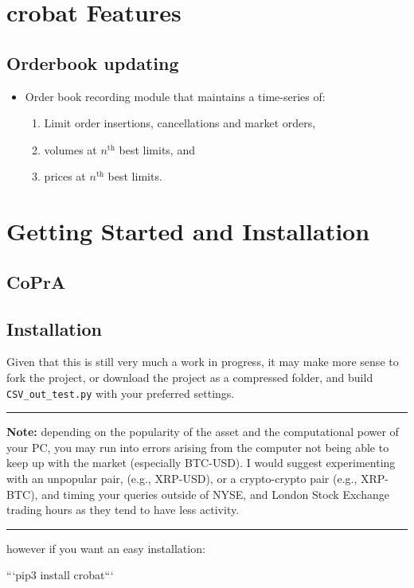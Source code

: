 \newpage
\section{crobat Features} 

\subsection{Orderbook updating}
\begin{itemize}
	\item Order book recording module that maintains a time-series of:
	\begin{enumerate}
		\item Limit order insertions, cancellations and market orders,
		\item volumes at $n^{\textrm{th}}$ best limits, and
		\item prices at  $n^{\textrm{th}}$ best limits.
	\end{enumerate}
\end{itemize}

\newpage

\section{Getting Started and Installation}

\subsection{CoPrA}

\subsection{Installation}

Given that this is still very much a work in progress, it may make more sense to fork the project, or download the project as a compressed folder, and build \texttt{CSV\_out\_test.py} with your preferred settings.
\medskip
\hrule
\smallskip
\noindent \textbf{Note:} depending on the popularity of the asset and the computational power of your PC, you may run into errors arising from the computer not being able to keep up with the market (especially BTC-USD). I would suggest experimenting with an unpopular pair, (e.g.,  XRP-USD), or a crypto-crypto pair (e.g., XRP-BTC), and timing your queries outside of NYSE, and London Stock Exchange trading hours as they tend to have less activity.
\smallskip
\hrule
however if you want an easy installation: 

```pip3 install crobat``` 

\newpage